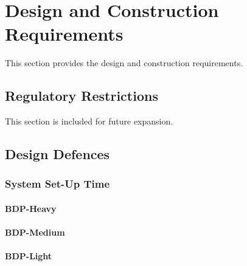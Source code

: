 \KNEADSECTIONNEWPAGE
\section{Design and Construction Requirements}
\label{lab:sec_DesignConstructionRequirements}


This section provides the \ThisSys design and construction requirements.

\KNEADSUBSECTIONNEWPAGE
\subsection{Regulatory Restrictions}
\label{lab:ssec_RegulatoryRestrictions}

This section is included for future expansion.




\KNEADSUBSECTIONNEWPAGE
\subsection{Design Defences}
\label{lab:ssec_DesignDefences}


\subsubsection{System Set-Up Time}
\label{loc:sssec_DesignDefencesSetUp}


\paragraph{BDP-Heavy}
\label{loc:para_SystemSetUpHeavy}


\paragraph{BDP-Medium}
\label{loc:para_SystemSetUpMedium}


\paragraph{BDP-Light}
\label{loc:para_SystemSetUpLight}




